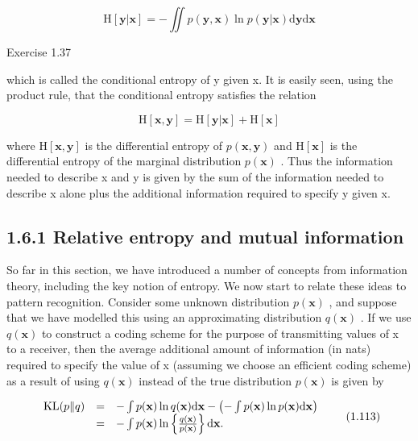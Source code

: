 \documentclass[
  10
]{article}
\begin{document}
\[
\mathrm{H} [ \mathbf {y} | \mathbf {x} ] = - \iint p (\mathbf {y}, \mathbf {x}) \ln p (\mathbf {y} | \mathbf {x}) \mathrm{d} \mathbf {y} \mathrm{d} \mathbf {x}\tag{1.111}
\]

Exercise 1.37

which is called the conditional entropy of y given x. It is easily seen,
using the product rule, that the conditional entropy satisfies the
relation

\[
\mathrm{H} [ \mathbf {x}, \mathbf {y} ] = \mathrm{H} [ \mathbf {y} | \mathbf {x} ] + \mathrm{H} [ \mathbf {x} ]\tag{1.112}
\]

where \(\mathrm { H } [ \mathbf { x } , \mathbf { y } ]\) is the
differential entropy of \(p ( \mathbf x , \mathbf y )\) and
\(\mathrm { H } [ \mathbf { x } ]\) is the differential entropy of the
marginal distribution \(p ( \mathbf { x } )\) . Thus the information
needed to describe x and y is given by the sum of the information needed
to describe x alone plus the additional information required to specify
y given x.

\subsection{1.6.1 Relative entropy and mutual
information}\label{relative-entropy-and-mutual-information}

So far in this section, we have introduced a number of concepts from
information theory, including the key notion of entropy. We now start to
relate these ideas to pattern recognition. Consider some unknown
distribution \(p ( \mathbf { x } )\) , and suppose that we have modelled
this using an approximating distribution \(q ( \mathbf { x } )\) . If we
use \(q ( \mathbf { x } )\) to construct a coding scheme for the purpose
of transmitting values of x to a receiver, then the average additional
amount of information (in nats) required to specify the value of x
(assuming we choose an efficient coding scheme) as a result of using
\(q ( \mathbf { x } )\) instead of the true distribution
\(p ( \mathbf { x } )\) is given by

\[
\begin{array}{r c l} \mathrm{KL} (p \| q) & = & - \int p (\mathbf {x}) \ln q (\mathbf {x})   \mathrm{d} \mathbf {x} - \left(- \int p (\mathbf {x}) \ln p (\mathbf {x})   \mathrm{d} \mathbf {x}\right) \\ & = & - \int p (\mathbf {x}) \ln \left\{\frac {q (\mathbf {x})}{p (\mathbf {x})} \right\}   \mathrm{d} \mathbf {x}. \end{array}\tag{1.113}
\]
\end{document}
